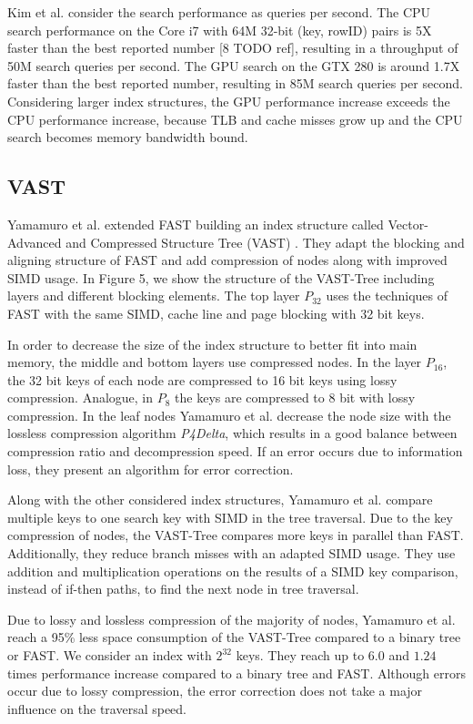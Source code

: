 \documentclass[conference]{IEEEtran}
\begin{document}
Kim et al. consider the search performance as queries per second. The CPU search performance on the Core i7 with 64M 32-bit (key, rowID) pairs is 5X faster than the best reported number [8 TODO ref], resulting in a throughput of 50M search queries per second. The GPU search on the GTX 280 is around 1.7X faster than the best reported number, resulting in 85M search queries per second. Considering larger index structures, the GPU performance increase exceeds the CPU performance increase, because TLB and cache misses grow up and the CPU search becomes memory bandwidth bound.

\subsection{VAST}\label{SCM}
Yamamuro et al. extended FAST building an index structure called Vector-Advanced and Compressed Structure Tree (VAST) \cite{b5}. They adapt the blocking and aligning structure of FAST and add compression of nodes along with improved SIMD usage. In Figure 5, we show the structure of the VAST-Tree including layers and different blocking elements. The top layer $P_{32}$ uses the techniques of FAST with the same SIMD, cache line and page blocking with 32 bit keys.

In order to decrease the size of the index structure to better fit into main memory, the middle and bottom layers use compressed nodes. In the layer $P_{16}$, the 32 bit keys of each node are compressed to 16 bit keys using lossy compression. Analogue, in $P_8$ the keys are compressed to 8 bit with lossy compression. In the leaf nodes Yamamuro et al. decrease the node size with the lossless compression algorithm \emph{P4Delta}, which results in a good balance between compression ratio and decompression speed. If an error occurs due to information loss, they present an algorithm for error correction.

Along with the other considered index structures, Yamamuro et al. compare multiple keys to one search key with SIMD in the tree traversal. Due to the key compression of nodes, the VAST-Tree compares more keys in parallel than FAST. Additionally, they reduce branch misses with an adapted SIMD usage. They use addition and multiplication operations on the results of a SIMD key comparison, instead of if-then paths, to find the next node in tree traversal.

Due to lossy and lossless compression of the majority of nodes, Yamamuro et al. reach a 95\% less space consumption of the VAST-Tree compared to a binary tree or FAST. We consider an index with $2^{32}$ keys. They reach up to $6.0$ and $1.24$ times performance increase compared to a binary tree and FAST. Although errors occur due to lossy compression, the error correction does not take a major influence on the traversal speed.
\end{document}
